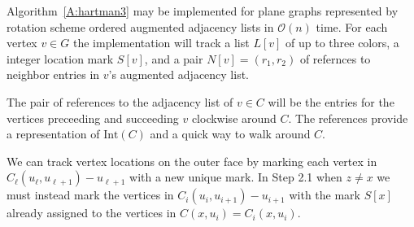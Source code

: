 \documentclass[12pt,letterpaper]{article}
\theoremstyle{plain}
\theoremstyle{definition}
\theoremstyle{break}
\begin{document}
% 
%
%

Algorithm~\ref{A:hartman3} may be implemented for plane graphs represented by
rotation scheme ordered augmented adjacency lists in $\mathcal{O}(n)$ time.
For each vertex $v\in G$ the implementation will track a list $L[v]$ of up to
three colors,
a integer location mark $S[v]$, and a pair $N[v]=(r_1,r_2)$ of refernces to
neighbor entries in $v$'s augmented adjacency list.

The pair of references to
the adjacency list of $v\in C$
will be the entries for the vertices preceeding and succeeding $v$ clockwise
around $C$. The references provide a representation of $\text{Int}(C)$ and a
quick way to walk around $C$.
 
We can track vertex locations on the outer face by marking each vertex in
$C_\ell(u_\ell,u_{\ell + 1})-u_{\ell+1}$ with a new unique mark.
In Step 2.1 when $z\ne x$ we must instead
mark the vertices in $C_i(u_i,u_{i+1})-u_{i+1}$ with the mark $S[x]$ 
already assigned to the vertices in $C(x,u_i)=C_i(x,u_i)$.
\end{document}
